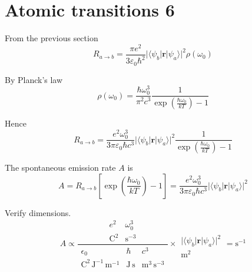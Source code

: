 

\section*{Atomic transitions 6}

From the previous section
\begin{equation*}
R_{a\rightarrow b}
=\frac{\pi e^2}{3\varepsilon_0\hbar^2}
\bigl|\langle\psi_b|\mathbf r|\psi_a\rangle\bigr|^2\rho(\omega_0)
\end{equation*}

By Planck's law
\begin{equation*}
\rho(\omega_0)=\frac{\hbar\omega_0^3}{\pi^2c^3}
\frac{1}{\exp\left(\frac{\hbar\omega_0}{kT}\right)-1}
\end{equation*}

Hence
\begin{equation*}
R_{a\rightarrow b}
=\frac{e^2\omega_0^3}{3\pi\varepsilon_0\hbar c^3}
\bigl|\langle\psi_b|\mathbf r|\psi_a\rangle\bigr|^2
\frac{1}{\exp\left(\frac{\hbar\omega_0}{kT}\right)-1}
\tag{1}
\end{equation*}

The spontaneous emission rate $A$ is
\begin{equation*}
A=R_{a\rightarrow b}\left[\exp\left(\frac{\hbar\omega_0}{kT}\right)-1\right]
=\frac{e^2\omega_0^3}{3\pi\varepsilon_0\hbar c^3}
\bigl|\langle\psi_b|\mathbf r|\psi_a\rangle\bigr|^2
\end{equation*}

Verify dimensions.
\begin{equation*}
A\propto
\frac{
\begin{matrix}
e^2 & \omega_0^3
\\
\text{C}^2 & \text{s}^{-3}
\end{matrix}
}
{
\begin{matrix}
\epsilon_0 & \hbar & c^3
\\
\text{C}^2\,\text{J}^{-1}\,\text{m}^{-1}
& \text{J}\,\text{s}
& \text{m}^3\,\text{s}^{-3}
\end{matrix}
}
\times
\begin{matrix}
\\
\bigl|\langle\psi_b|\mathbf r|\psi_a\rangle\bigr|^2
\\
\text{m}^2
\end{matrix}
=\text{s}^{-1}
\end{equation*}


